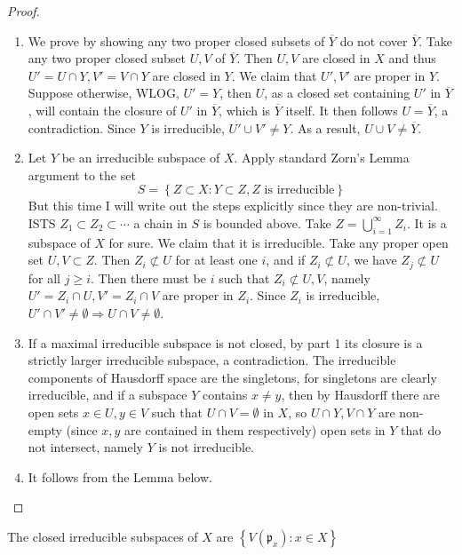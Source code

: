 \documentclass{solution}
\begin{document}
\begin{proof}
    \begin{enumerate}
        \item We prove by showing any two proper closed subsets of $\overline{Y}$ do not cover $\overline{Y}$. Take any two proper closed subset $U, V$ of $\overline{Y}$. Then $U, V$ are closed in $X$ and thus $U' = U \cap Y, V' = V \cap Y$ are closed in $Y$. We claim that $U', V'$ are proper in $Y$. Suppose otherwise, WLOG, $U' = Y$, then $U$, as a closed set containing $U'$ in $\overline{Y}$, will contain the closure of $U'$ in $\overline{Y}$, which is $\overline{Y}$ itself. It then follows $U = \overline{Y}$, a contradiction. Since $Y$ is irreducible, $U' \cup V' \ne Y$. As a result, $U \cup V \ne \overline{Y}$.
        \item Let $Y$ be an irreducible subspace of $X$. Apply standard Zorn's Lemma argument to the set
        $$S = \left\lbrace Z \subset X: Y \subset Z, Z \text{ is irreducible} \right\rbrace$$
        But this time I will write out the steps explicitly since they are non-trivial. ISTS $Z_1 \subset Z_2 \subset \cdots$ a chain in $S$ is bounded above. Take $Z = \bigcup\limits_{i = 1}^{\infty} Z_i$. It is a subspace of $X$ for sure. We claim that it is irreducible. Take any proper open set $U, V \subset Z$. Then $Z_i \not\subset U$ for at least one $i$, and if $Z_i \not\subset U$, we have $Z_j \not\subset U$ for all $j \ge i$. Then there must be $i$ such that $Z_i \not\subset U, V$, namely $U' = Z_i \cap U, V' = Z_i \cap V$ are proper in $Z_i$. Since $Z_i$ is irreducible, $U' \cap V' \ne \emptyset \Rightarrow U \cap V \ne \emptyset$. 

        \item If a maximal irreducible subspace is not closed, by part 1 its closure is a strictly larger irreducible subspace, a contradiction. The irreducible components of Hausdorff space are the singletons, for singletons are clearly irreducible, and if a subspace $Y$ contains $x \ne y$, then by Hausdorff there are open sets $x \in U, y \in V$ such that $U \cap V = \emptyset$ in $X$, so $U \cap Y, V \cap Y$ are non-empty (since $x, y$ are contained in them respectively) open sets in $Y$ that do not intersect, namely $Y$ is not irreducible.
        \item It follows from the Lemma below.
    \end{enumerate}
\end{proof}

\begin{lemma}
    The closed irreducible subspaces of $X$ are $\left\lbrace V(\mathfrak{p}_x): x \in X\right\rbrace$
\end{lemma}
\end{document}
